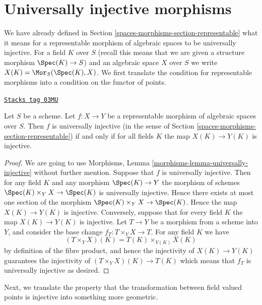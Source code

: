 \section{Universally injective morphisms}
\label{spaces-morphisms-section-universally-injective}
We have already defined in Section \ref{spaces-morphisms-section-representable}
what it means for a representable morphism of algebraic spaces
to be universally injective. For a field $K$ over $S$ (recall this means that
we are given a structure morphism $\Spec(K) \to S$) and an
algebraic space $X$ over $S$ we write
$X(K) = \Mor_S(\Spec(K), X)$. We first translate the
condition for representable morphisms into a condition on the functor
of points.

\begin{lemma}
\label{spaces-morphisms-lemma-universally-injective-representable}
\href{https://stacks.math.columbia.edu/tag/03MU}{\texttt{Stacks tag 03MU}}

Let $S$ be a scheme. Let $f : X \to Y$ be a representable
morphism of algebraic spaces over $S$. Then $f$ is universally injective
(in the sense of Section \ref{spaces-morphisms-section-representable})
if and only if for all fields $K$ the map $X(K) \to Y(K)$ is injective.
\end{lemma}

\begin{proof}
We are going to use
Morphisms, Lemma \ref{morphisms-lemma-universally-injective}
without further mention.
Suppose that $f$ is universally injective. Then for any field $K$ and any
morphism $\Spec(K) \to Y$ the morphism of schemes
$\Spec(K) \times_Y X \to \Spec(K)$ is universally injective.
Hence there exists at most one section of the morphism
$\Spec(K) \times_Y X \to \Spec(K)$. Hence the map
$X(K) \to Y(K)$ is injective. Conversely, suppose that for every field $K$
the map $X(K) \to Y(K)$ is injective. Let $T \to Y$ be a morphism from a
scheme into $Y$, and consider the base change $f_T : T \times_Y X \to T$.
For any field $K$ we have
$$
(T \times_Y X)(K) = T(K) \times_{Y(K)} X(K)
$$
by definition of the fibre product, and hence the injectivity of
$X(K) \to Y(K)$ guarantees the injectivity of
$(T \times_Y X)(K) \to T(K)$ which means that $f_T$ is universally injective
as desired.
\end{proof}

Next, we translate the property that the transformation between field valued
points is injective into something more geometric.

